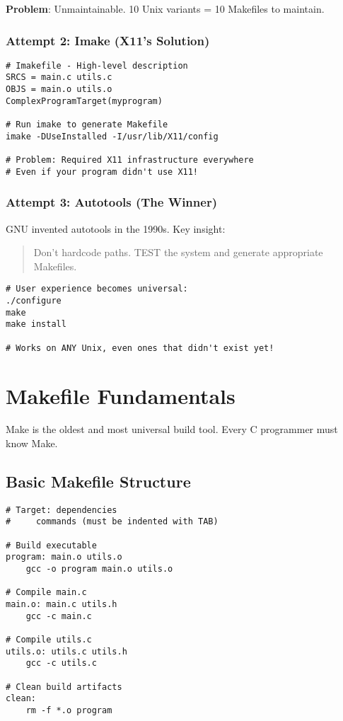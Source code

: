 \textbf{Problem}: Unmaintainable. 10 Unix variants = 10 Makefiles to maintain.

\subsubsection{Attempt 2: Imake (X11's Solution)}

\begin{lstlisting}
# Imakefile - High-level description
SRCS = main.c utils.c
OBJS = main.o utils.o
ComplexProgramTarget(myprogram)

# Run imake to generate Makefile
imake -DUseInstalled -I/usr/lib/X11/config

# Problem: Required X11 infrastructure everywhere
# Even if your program didn't use X11!
\end{lstlisting}

\subsubsection{Attempt 3: Autotools (The Winner)}

GNU invented autotools in the 1990s. Key insight:

\begin{quote}
Don't hardcode paths. TEST the system and generate appropriate Makefiles.
\end{quote}

\begin{lstlisting}
# User experience becomes universal:
./configure
make
make install

# Works on ANY Unix, even ones that didn't exist yet!
\end{lstlisting}

\section{Makefile Fundamentals}

Make is the oldest and most universal build tool. Every C programmer must know Make.

\subsection{Basic Makefile Structure}

\begin{lstlisting}
# Target: dependencies
#     commands (must be indented with TAB)

# Build executable
program: main.o utils.o
	gcc -o program main.o utils.o

# Compile main.c
main.o: main.c utils.h
	gcc -c main.c

# Compile utils.c
utils.o: utils.c utils.h
	gcc -c utils.c

# Clean build artifacts
clean:
	rm -f *.o program
\end{lstlisting}

